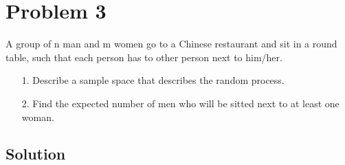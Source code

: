 
\section{Problem 3}

A group of n man and m women go to a Chinese restaurant and sit in a round table,
such that each person has to other person next to him/her.
\begin{itemize}
	\item[1.] Describe a sample space that describes the random process.
	\item[2.] Find the expected number of men who will be sitted next to at least one woman.
\end{itemize} 

\subsection{Solution}
